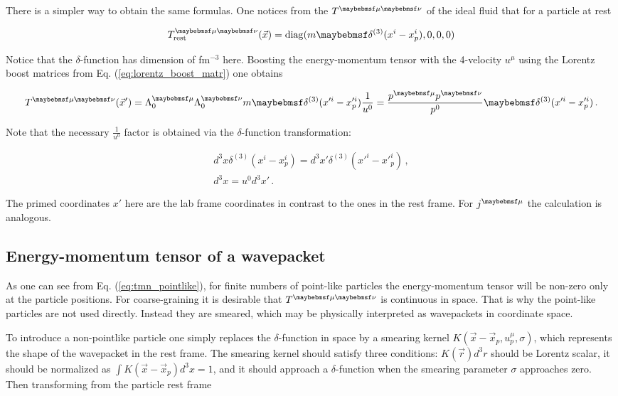 There is a simpler way to obtain the same formulas. One notices from the
 $\Tmn$ of the ideal fluid that for a particle at rest

\begin{equation}
  \Tmn_{\mathrm{rest}}(\vec{x}) = \mathrm{diag}(m \delta^{(3)}(x^i - x^i_p), 0, 0, 0)
\end{equation}

Notice that the $\delta$-function has dimension of fm$^{-3}$ here. Boosting the
energy-momentum tensor with the 4-velocity $u^{\mu}$ using the Lorentz boost matrices
from Eq. (\ref{eq:lorentz_boost_matr}) one obtains

\begin{equation}
  \Tmn(\vec{x}') = \Lambda^{\mu}_0 \Lambda^{\nu}_0 m \delta^{(3)}(x'^i - x'^i_p)
                   \frac{1}{u^0}
           = \frac{p^{\mu}p^{\nu}}{p^0} \delta^{(3)}(x'^i - x'^i_p) \,.
\end{equation}

Note that the necessary $\frac{1}{u^0}$ factor is obtained via the $\delta$-function transformation:

\begin{align}
  d^3x \delta^{(3)}(x^i - x^i_p) = d^3x' \delta^{(3)}(x'^i - x'^i_p) \,, \\
  d^3x  = u^0 d^3x' \,.
\end{align}

The primed coordinates $x'$ here are the lab frame coordinates in contrast to
the ones in the rest frame. For $\jmu$ the calculation is analogous.

\subsection{Energy-momentum tensor of a wavepacket} \label{sec:tmn_wavepacket}

As one can see from Eq. (\ref{eq:tmn_pointlike}), for finite numbers of point-like
particles  the energy-momentum tensor will be non-zero only at the particle
positions. For coarse-graining it is desirable that $\Tmn$ is continuous in
space. That is why the point-like particles are not used directly. Instead they
are smeared, which may be physically interpreted as wavepackets in coordinate space.

To introduce a non-pointlike particle one simply replaces the $\delta$-function in
space by a smearing kernel $K(\vec{x} - \vec{x}_p, u^{\mu}_p, \sigma)$, which
represents the shape of the wavepacket in the rest frame. The smearing kernel should
satisfy three conditions: $K(\vec{r})d^3r$ should be Lorentz scalar, it should be
normalized as $\int K(\vec{x} - \vec{x}_p) d^3x = 1$, and it should approach a
$\delta$-function when the smearing parameter $\sigma$ approaches zero. Then
transforming from the particle rest frame


